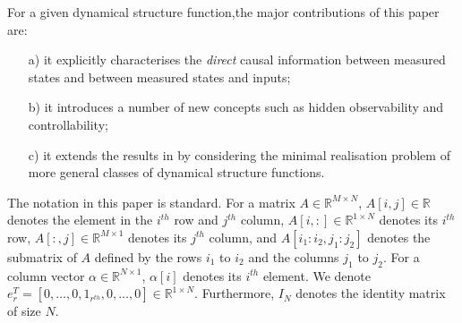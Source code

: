 \documentclass[twocolumn,12pt]{autart}
\theoremstyle{plain}
\begin{document}
For a given dynamical structure function,the major contributions of this paper are: 
\begin{itemize} 
\item[a)]  it explicitly characterises the {\em direct} causal information between measured states and between measured states and inputs;
\item[b)] it introduces a number of new concepts such as hidden observability and controllability; 
\item[c)] it extends the results in \cite{yetac} by considering the minimal realisation problem of more general classes of dynamical structure functions. 
\end{itemize} 

The notation in this paper is standard. For a matrix $A \in \mathbb{R}^{M \times N}$, $A[i,j] \in
\mathbb{R}$ denotes the element in the $i^{th}$ row and $j^{th}$
column, $A[i,:] \in \mathbb{R}^{1 \times N}$ denotes its $i^{th}$
row, $A[:,j] \in \mathbb{R}^{M \times 1}$ denotes its $j^{th}$
column, and $A[i_1:i_2,j_1:j_2]$ 
denotes the submatrix of $A$ defined by the rows $i_1$ to $i_2$ and the columns $j_1$ to $j_2$.
For a column vector $\alpha \in \mathbb{R}^{N\times 1}$, $\alpha[i]$
denotes its $i^{th}$ element. 
We denote $e_r^T=[0,\ldots,0,1_{r^{th}},0,\ldots,0] \in
\mathbb{R}^{1 \times N}$. Furthermore, 
$I_N$ denotes the identity matrix of size $N$.
\end{document}
